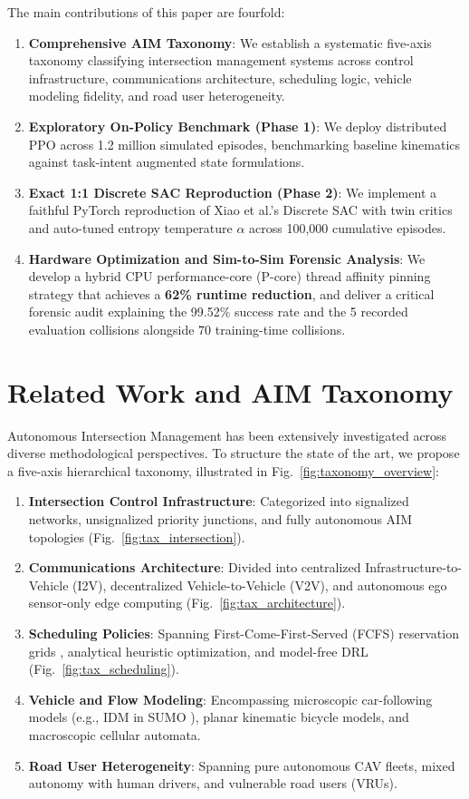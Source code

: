 \documentclass[journal]{IEEEtran}
\begin{document}
The main contributions of this paper are fourfold:
\begin{enumerate}
    \item \textbf{Comprehensive AIM Taxonomy}: We establish a systematic five-axis taxonomy classifying intersection management systems across control infrastructure, communications architecture, scheduling logic, vehicle modeling fidelity, and road user heterogeneity.
    \item \textbf{Exploratory On-Policy Benchmark (Phase 1)}: We deploy distributed PPO across 1.2 million simulated episodes, benchmarking baseline kinematics against task-intent augmented state formulations.
    \item \textbf{Exact 1:1 Discrete SAC Reproduction (Phase 2)}: We implement a faithful PyTorch reproduction of Xiao et al.'s Discrete SAC with twin critics and auto-tuned entropy temperature $\alpha$ across 100,000 cumulative episodes.
    \item \textbf{Hardware Optimization and Sim-to-Sim Forensic Analysis}: We develop a hybrid CPU performance-core (P-core) thread affinity pinning strategy that achieves a \textbf{62\% runtime reduction}, and deliver a critical forensic audit explaining the 99.52\% success rate and the 5 recorded evaluation collisions alongside 70 training-time collisions.
\end{enumerate}

\section{Related Work and AIM Taxonomy}
Autonomous Intersection Management has been extensively investigated across diverse methodological perspectives. To structure the state of the art, we propose a five-axis hierarchical taxonomy, illustrated in Fig.~\ref{fig:taxonomy_overview}:
\begin{enumerate}
    \item \textbf{Intersection Control Infrastructure}: Categorized into signalized networks, unsignalized priority junctions, and fully autonomous AIM topologies (Fig.~\ref{fig:tax_intersection}).
    \item \textbf{Communications Architecture}: Divided into centralized Infrastructure-to-Vehicle (I2V), decentralized Vehicle-to-Vehicle (V2V), and autonomous ego sensor-only edge computing (Fig.~\ref{fig:tax_architecture}).
    \item \textbf{Scheduling Policies}: Spanning First-Come-First-Served (FCFS) reservation grids \cite{dresner2008multiagent}, analytical heuristic optimization, and model-free DRL (Fig.~\ref{fig:tax_scheduling}).
    \item \textbf{Vehicle and Flow Modeling}: Encompassing microscopic car-following models (e.g., IDM \cite{treiber2000congested} in SUMO \cite{krajzewicz2012recent}), planar kinematic bicycle models, and macroscopic cellular automata.
    \item \textbf{Road User Heterogeneity}: Spanning pure autonomous CAV fleets, mixed autonomy with human drivers, and vulnerable road users (VRUs).
\end{enumerate}
\end{document}

